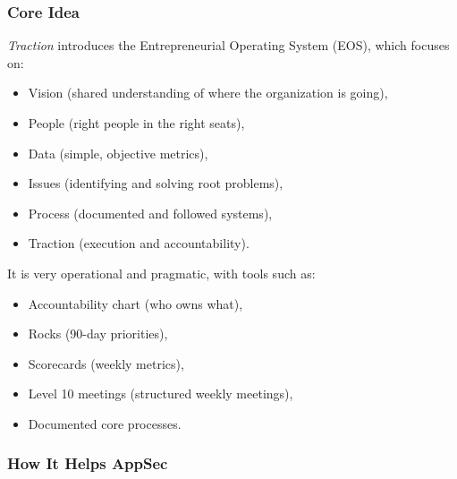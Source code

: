 \documentclass[11pt]{article}
\begin{document}
\subsubsection*{Core Idea}

\emph{Traction} introduces the Entrepreneurial Operating System (EOS),
which focuses on:

\begin{itemize}
  \item Vision (shared understanding of where the organization is going),
  \item People (right people in the right seats),
  \item Data (simple, objective metrics),
  \item Issues (identifying and solving root problems),
  \item Process (documented and followed systems),
  \item Traction (execution and accountability).
\end{itemize}

It is very operational and pragmatic, with tools such as:

\begin{itemize}
  \item Accountability chart (who owns what),
  \item Rocks (90-day priorities),
  \item Scorecards (weekly metrics),
  \item Level 10 meetings (structured weekly meetings),
  \item Documented core processes.
\end{itemize}

\subsubsection*{How It Helps AppSec}
\end{document}

